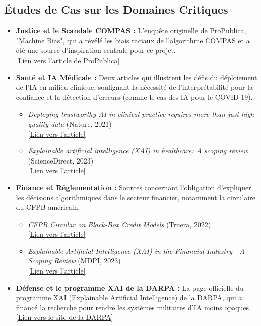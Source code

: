 \documentclass{article}
\begin{document}
\subsection*{Études de Cas sur les Domaines Critiques}

\begin{itemize}
    \item \textbf{Justice et le Scandale COMPAS :} L'enquête originelle de ProPublica, "Machine Bias", qui a révélé les biais raciaux de l'algorithme COMPAS et a été une source d'inspiration centrale pour ce projet. \\
    \href{https://www.propublica.org/article/machine-bias-risk-assessments-in-criminal-sentencing}{[Lien vers l'article de ProPublica]}

    \item \textbf{Santé et IA Médicale :} Deux articles qui illustrent les défis du déploiement de l'IA en milieu clinique, soulignant la nécessité de l'interprétabilité pour la confiance et la détection d'erreurs (comme le cas des IA pour le COVID-19).
    \begin{itemize}
        \item \textit{Deploying trustworthy AI in clinical practice requires more than just high-quality data} (Nature, 2021) \\
        \href{https://www.nature.com/articles/s42256-021-00338-7}{[Lien vers l'article]}
        \item \textit{Explainable artificial intelligence (XAI) in healthcare: A scoping review} (ScienceDirect, 2023) \\
        \href{https://www.sciencedirect.com/science/article/pii/S0933365723001732}{[Lien vers l'article]}
    \end{itemize}

    \item \textbf{Finance et Réglementation :} Sources concernant l'obligation d'expliquer les décisions algorithmiques dans le secteur financier, notamment la circulaire du CFPB américain.
    \begin{itemize}
        \item \textit{CFPB Circular on Black-Box Credit Models} (Truera, 2022) \\
        \href{https://truera.com/ai-quality-education/ai-regulation/cfpb-circular-on-black-box-credit-models-five-considerations-for-lenders}{[Lien vers l'article]}
        \item \textit{Explainable Artificial Intelligence (XAI) in the Financial Industry—A Scoping Review} (MDPI, 2023) \\
        \href{https://www.mdpi.com/2673-2688/4/2/23}{[Lien vers l'article]}
    \end{itemize}

    \item \textbf{Défense et le programme XAI de la DARPA :} La page officielle du programme XAI (Explainable Artificial Intelligence) de la DARPA, qui a financé la recherche pour rendre les systèmes militaires d'IA moins opaques. \\
    \href{https://www.darpa.mil/program/explainable-artificial-intelligence}{[Lien vers le site de la DARPA]}
\end{itemize}
\end{document}
